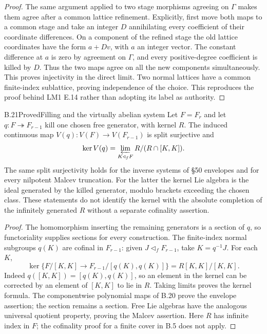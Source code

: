 \begin{proof}
The same argument applied to two stage morphisms agreeing on $\Gamma$
makes them agree after a common lattice refinement. Explicitly,
first move both maps to a common stage and take an integer $D$
annihilating every coefficient of their coordinate differences.
On a component of the refined stage the old lattice coordinates
have the form $a+Dv$, with $a$ an integer vector. The constant
difference at $a$ is zero by agreement on $\Gamma$, and every
positive-degree coefficient is killed by $D$. Thus the two maps
agree on all the new components simultaneously. This proves
injectivity in the direct limit. Two normal lattices have a common
finite-index sublattice, proving independence of the choice. This
reproduces the proof behind LM1 E.14 rather than adopting its label
as authority.
\end{proof}

\begin{statement}{B.21}{Proved}{Filling and the virtually abelian system}
Let $F=F_r$ and let $q:F\twoheadrightarrow F_{r-1}$ kill one chosen
free generator, with kernel $R$. The induced continuous map
$V(q):V(F)\to V(F_{r-1})$ is split surjective and
\[
 \ker V(q)=
 \varprojlim_{K\triangleleft_f F} R/(R\cap[K,K]).
\]
The same split surjectivity holds for the inverse systems of
\S50 envelopes and for every nilpotent Malcev truncation.
For the latter the kernel Lie algebra is the ideal generated by
the killed generator, modulo brackets exceeding the chosen class.
These statements do not identify the kernel with the absolute
completion of the infinitely generated $R$ without a separate
cofinality assertion.
\end{statement}
\begin{proof}
The homomorphism inserting the remaining generators is a section of
$q$, so functoriality supplies sections for every construction.
The finite-index normal subgroups $q(K)$ are cofinal in $F_{r-1}$:
given $J\triangleleft_fF_{r-1}$, take $K=q^{-1}J$.
For each $K$,
\[
 \ker\{F/[K,K]\to F_{r-1}/[q(K),q(K)]\}
 =R[K,K]/[K,K].
\]
Indeed $q([K,K])=[q(K),q(K)]$, so an element in the kernel can
be corrected by an element of $[K,K]$ to lie in $R$.
Taking limits proves the kernel formula. The componentwise
polynomial maps of B.20 prove the envelope assertion; the
section remains a section. Free Lie algebras have the analogous
universal quotient property, proving the Malcev assertion.
Here $R$ has infinite index in $F$; the cofinality proof for a
finite cover in B.5 does not apply.
\end{proof}

